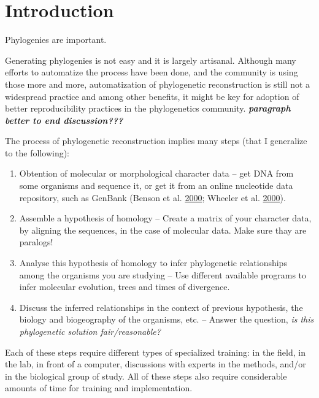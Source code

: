 \documentclass[]{article}
\providecommand{\tightlist}{%
  \setlength{\itemsep}{0pt}\setlength{\parskip}{0pt}}
\begin{document}
\hypertarget{introduction}{%
\section{Introduction}\label{introduction}}

Phylogenies are important.

Generating phylogenies is not easy and it is largely artisanal. Although many efforts to automatize the process have been done, and the community is using those more and more, automatization of phylogenetic reconstruction is still not a widespread practice and among other benefits, it might be key for adoption of better reproducibility practices in the phylogenetics community. \textbf{\emph{paragraph better to end discussion??? }}

The process of phylogenetic reconstruction implies many steps (that I generalize to the following):

\begin{enumerate}
\def\labelenumi{\arabic{enumi}.}
\tightlist
\item
  Obtention of molecular or morphological character data -- get DNA from some organisms
  and sequence it, or get it from an online nucleotide data repository, such as GenBank (Benson et al. \protect\hyperlink{ref-benson2000genbank}{2000}; Wheeler et al. \protect\hyperlink{ref-wheeler2000database}{2000}).
\item
  Assemble a hypothesis of homology -- Create a matrix of your character data, by
  aligning the sequences, in the case of molecular data. Make sure thay are paralogs!
\item
  Analyse this hypothesis of homology to infer phylogenetic relationships among
  the organisms you are studying -- Use different available programs to infer molecular
  evolution, trees and times of divergence.
\item
  Discuss the inferred relationships in the context of previous hypothesis, the
  biology and biogeography of the organisms, etc. -- Answer the question, \emph{is this phylogenetic solution fair/reasonable?}
\end{enumerate}

Each of these steps require different types of specialized training: in the field,
in the lab, in front of a computer, discussions with experts in the methods, and/or in the biological group of study.
All of these steps also require considerable amounts of time for training and implementation.
\end{document}

